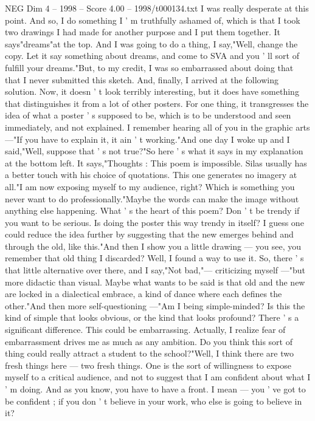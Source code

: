 \begin{textsample}{NEG Dim 4 – 1998 – Score 4.00 – 1998/t000134.txt}
I was really desperate at this point.
And so, I do something I ' m truthfully ashamed of, which is that I took two drawings I had made for another purpose and I put them together.
It says"dreams"at the top.
And I was going to do a thing, I say,"Well, change the copy.
Let it say something about dreams, and come to SVA and you ' ll sort of fulfill your dreams."But, to my credit, I was so embarrassed about doing that that I never submitted this sketch.
And, finally, I arrived at the following solution.
Now, it doesn ' t look terribly interesting, but it does have something that distinguishes it from a lot of other posters.
For one thing, it transgresses the idea of what a poster ' s supposed to be, which is to be understood and seen immediately, and not explained.
I remember hearing all of you in the graphic arts —"If you have to explain it, it ain ' t working."And one day I woke up and I said,"Well, suppose that ' s not true?"So here ' s what it says in my explanation at the bottom left.
It says,"Thoughts : This poem is impossible.
Silas usually has a better touch with his choice of quotations.
This one generates no imagery at all."I am now exposing myself to my audience, right?
Which is something you never want to do professionally."Maybe the words can make the image without anything else happening.
What ' s the heart of this poem?
Don ' t be trendy if you want to be serious.
Is doing the poster this way trendy in itself?
I guess one could reduce the idea further by suggesting that the new emerges behind and through the old, like this."And then I show you a little drawing — you see, you remember that old thing I discarded?
Well, I found a way to use it.
So, there ' s that little alternative over there, and I say,"Not bad,"— criticizing myself —"but more didactic than visual.
Maybe what wants to be said is that old and the new are locked in a dialectical embrace, a kind of dance where each defines the other."And then more self-questioning —"Am I being simple-minded?
Is this the kind of simple that looks obvious, or the kind that looks profound?
There ' s a significant difference.
This could be embarrassing.
Actually, I realize fear of embarrassment drives me as much as any ambition.
Do you think this sort of thing could really attract a student to the school?"Well, I think there are two fresh things here — two fresh things.
One is the sort of willingness to expose myself to a critical audience, and not to suggest that I am confident about what I ' m doing.
And as you know, you have to have a front.
I mean — you ' ve got to be confident ; if you don ' t believe in your work, who else is going to believe in it?

\end{textsample}
